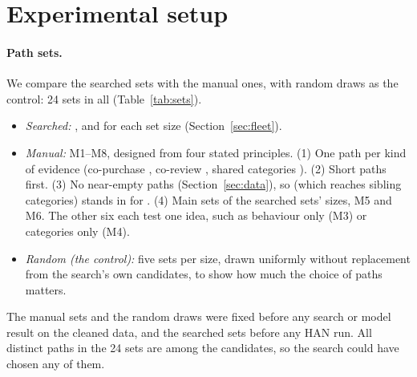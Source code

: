 \section{Experimental setup}
\label{sec:setup}

\paragraph{Path sets.} We compare the searched sets with the manual ones, with random draws as the
control: 24 sets in all (Table~\ref{tab:sets}).
\begin{itemize}
  \item \emph{Searched:} ,  and  for each set size
        (Section~\ref{sec:fleet}).
  \item \emph{Manual:} M1--M8, designed from four stated principles. (1) One path per kind of
        evidence (co-purchase , co-review , shared categories ).
        (2) Short paths first. (3) No near-empty paths (Section~\ref{sec:data}), so 
        (which reaches sibling categories) stands in for . (4) Main sets of the searched
        sets' sizes, M5 and M6. The other six each test one idea, such as behaviour only (M3) or
        categories only (M4).
  \item \emph{Random (the control):} five sets per size, drawn uniformly without replacement from
        the search's own  candidates, to show how much the choice of paths
        matters.
\end{itemize}
The manual sets and the random draws were fixed before any search or model result on the cleaned
data, and the searched sets before any HAN run. All  distinct paths in the
24 sets are among the  candidates, so the search could have chosen any of them.



